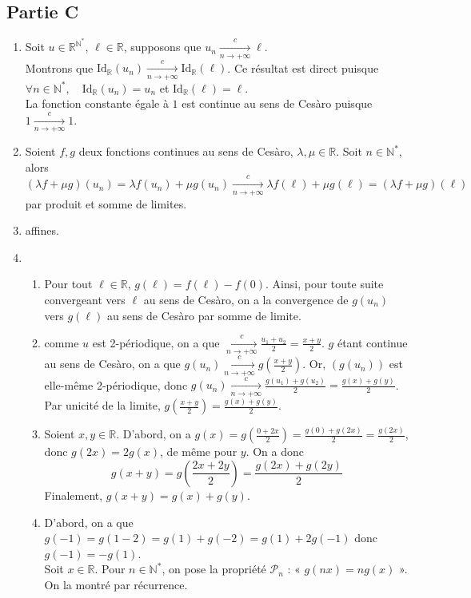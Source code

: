 \documentclass[17pt]{article}
\def\N{\mathbb N}
\def\R{\mathbb R}
\begin{document}
	\subsection*{Partie C}
	\begin{enumerate}[start=7]
		\item Soit $u\in\R^{\N^*}$, $\ell\in\R$, supposons que $u_n\xrightarrow[n\rightarrow +\infty ]{c}\ell$.\\
		Montrons que $\text{Id}_\R(u_n)\xrightarrow[n\rightarrow +\infty ]{c}\text{Id}_\R(\ell)$. Ce résultat est direct puisque $\forall n\in\N^*,\quad \text{Id}_\R(u_n)=u_n$ et $\text{Id}_\R(\ell)=\ell$.\\
		La fonction constante égale à $1$ est continue au sens de Cesàro puisque $1\xrightarrow[n\rightarrow +\infty ]{c}1$.
		\item Soient $f,g$ deux fonctions continues au sens de Cesàro, $\lambda,\mu\in\R$. Soit $n\in\N^*$, alors $(\lambda f+\mu g)(u_n)=\lambda f(u_n)+\mu g(u_n)\xrightarrow[n\rightarrow +\infty ]{c}\lambda f(\ell)+\mu g(\ell)=(\lambda f+\mu g)(\ell)$ par produit et somme de limites.
		\item affines.
		\item
		\begin{enumerate}
			\item Pour tout $\ell\in\R$, $g(\ell)=f(\ell)-f(0)$. Ainsi, pour toute suite convergeant vers $\ell$ au sens de Cesàro, on a la convergence de $g(u_n)$ vers $g(\ell)$ au sens de Cesàro par somme de limite.
			\item comme $u$ est 2-périodique, on a que $\xrightarrow[n\rightarrow +\infty ]{c}\frac{u_1+u_2}2=\frac{x+y}2$. $g$ étant continue au sens de Cesàro, on a que $g(u_n)\xrightarrow[n\rightarrow +\infty ]{c}g\left(\frac{x+y}2\right)$. Or, $(g(u_n))$ est elle-même 2-périodique, donc $g(u_n)\xrightarrow[n\rightarrow +\infty ]{c}\frac{g(u_1)+g(u_2)}2=\frac{g(x)+g(y)}2$. Par unicité de la limite, $\boxed{g\left(\frac{x+y}2\right)=\frac{g(x)+g(y)}2}$.
			\item Soient $x, y\in\R$. D'abord, on a $g(x)=g\left(\frac{0+2x}2\right)=\frac{g(0)+g(2x)}2=\frac{g(2x)}2$, donc $g(2x)=2g(x)$, de même pour $y$. On a donc \[g(x+y)=g\left(\frac{2x+2y}{2}\right)=\frac{g(2x)+g(2y)}{2}\]
			Finalement, $\boxed{g(x+y)=g(x)+g(y)}$.
			\item D'abord, on a que $g(-1)=g(1-2)=g(1)+g(-2)=g(1)+2g(-1)$ donc $g(-1)=-g(1)$.\\
			Soit $x\in\R$. Pour $n\in\N^*$, on pose la propriété $\mathcal{P}_n$ : « $g(nx)=ng(x)$ ». On la montré par récurrence.

\end{enumerate}
\end{enumerate}
\end{document}
